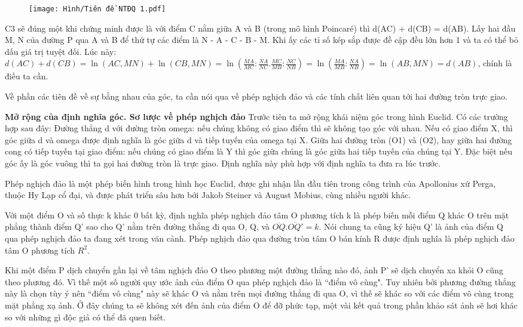 \begin{multicols}{2}
	\begin{figure}[ht]
		\texttt{[image: Hình/Tiên đề NTĐQ 1.pdf]}
	\end{figure}
	
	C3 sẽ đúng một khi chứng minh được là với điểm C nằm giữa A và B (trong mô hình Poincaré) thì d(AC) + d(CB) = d(AB). Lấy hai đầu M, N của đường P qua A và B để thứ tự các điểm là N - A - C - B - M.
	Khi ấy các tỉ số kép sắp được đề cập đều lớn hơn 1 và ta có thể bỏ dấu giá trị tuyệt đối. Lúc này:
	$d(AC) + d(CB) = \ln{(AC, MN)} + \ln{(CB, MN)} = \ln{\left(\frac{MA}{MC} : \frac{NA}{NC} . \frac{MC}{MB} : \frac{NC}{NB} \right)} = \ln{ \left(\frac{MA}{MB} : \frac{NA}{NB}\right)} = \ln{(AB, MN)} = d(AB)$, chính là điều ta cần.
	
	Về phần các tiên đề về sự bằng nhau của góc, ta cần nói qua về phép nghịch đảo và các tính chất liên quan tới hai đường tròn trực giao.
	
	\textbf{\color{lichsutoanhoc}Mở rộng của định nghĩa góc. Sơ lược về phép nghịch đảo}
	Trước tiên ta mở rộng khái niệm góc trong hình Euclid. Có các trường hợp sau đây:
	Đường thẳng d với đường tròn omega: nếu chúng không có giao điểm thì sẽ không tạo góc với nhau. Nếu có giao điểm X, thì góc giữa d và omega được định nghĩa là góc giữa d và tiếp tuyến của omega tại X.
	Giữa hai đường tròn (O1) và (O2), hay giữa hai đường cong có tiếp tuyến tại giao điểm: nếu chúng có giao điểm là Y thì góc giữa chúng là góc giữa hai tiếp tuyến của chúng tại Y. Đặc biệt nếu góc ấy là góc vuông thì ta gọi hai đường tròn là trực giao. Định nghĩa này phù hợp với định nghĩa ta đưa ra lúc trước. 
	
	
	Phép nghịch đảo là một phép biến hình trong hình học Euclid, được ghi nhận lần đầu tiên trong công trình của Apollonius xứ Perga, thuộc Hy Lạp cổ đại, và được phát triển sâu hơn bởi Jakob Steiner và August Mobius, cùng nhiều người khác.
	
	Với một điểm O và số thực k khác 0 bất kỳ, định nghĩa phép nghịch đảo tâm O phương tích k là phép biến mỗi điểm Q khác O trên mặt phẳng thành điểm Q' sao cho Q' nằm trên đường thẳng đi qua O, Q, và $ \overline{OQ}.\overline{OQ'} = k$. Nói chung ta cũng ký hiệu Q' là ảnh của điểm Q qua phép nghịch đảo ta đang xét trong văn cảnh.
	Phép nghịch đảo qua đường tròn tâm O bán kính R được định nghĩa là phép nghịch đảo tâm O phương tích $R^2$.
	
	Khi một điểm P dịch chuyển gần lại về tâm nghịch đảo O theo phương một đường thẳng nào đó, ảnh P' sẽ dịch chuyển xa khỏi O cũng theo phương đó. Vì thế một số người quy ước ảnh của điểm O qua phép nghịch đảo là ``điểm vô cùng". Tuy nhiên bởi phương đường thẳng này là chọn tùy ý nên ``điểm vô cùng" này sẽ khác O và nằm trên mọi đường thẳng đi qua O, vì thế sẽ khác so với các điểm vô cùng trong mặt phẳng xạ ảnh. Ở đây chúng ta sẽ không xét đến ảnh của điểm O để đỡ phức tạp, một vài kết quả trong phần khảo sát ảnh sẽ hơi khác so với những gì độc giả có thể đã quen biết.
	

\end{multicols}
